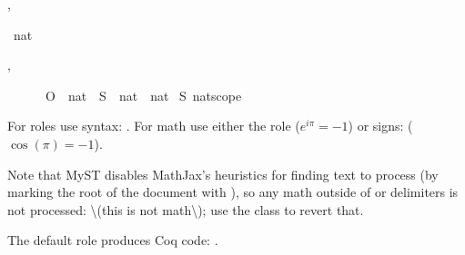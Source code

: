 \documentclass[letterpaper,10pt,english]{sphinxmanual}
\begin{document}
\begin{alectryon}
  \sep
  \begin{sentence}
    \begin{input}
      ~nat
    \end{input}
    \sep
    \begin{output}
      \begin{messages}
        \begin{message}
          ~~~~~~O~~nat~~S~~nat~~nat\nl
          \nl
          ~S~\PYGZus{}nat\PYGZus{}scope
        \end{message}
      \end{messages}
    \end{output}
  \end{sentence}
\end{alectryon}

\sphinxAtStartPar
For roles use  syntax: .  For math use either the  role (\(e^{i\pi} = -1\)) or \sphinxcode{\sphinxupquote{\$}} signs: (\(\cos(\pi) = -1\)).

\sphinxAtStartPar
Note that MyST disables MathJax’s heuristics for finding text to process (by marking the root of the document with ), so any math outside of  or \sphinxcode{\sphinxupquote{\$}} delimiters is not processed: \textbackslash{}(this is not math\textbackslash{}); use the  class to revert that.

\sphinxAtStartPar
The default role produces Coq code: .
\end{document}
